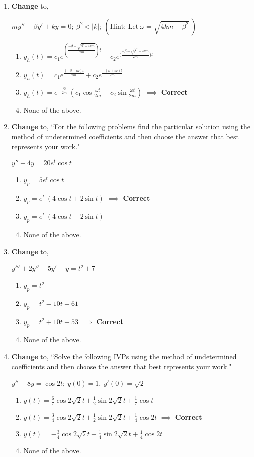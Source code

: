 \documentclass[fleqn]{article}[11pt]
\begin{document}
\begin{enumerate}
	\item \textbf{Change} to,
	
		\(my''+\beta y'+ky=0;\ \beta^{2} < |k|;\ (\text{Hint: Let}\ \omega=\sqrt{4km-\beta^{2}}\ )\)
			\begin{enumerate}
				\item $y_{h}(t)=c_{1}e^{(\frac{-\beta+\sqrt{\beta^{2}-4km}}{2m})t}+c_{2}e^{{(\frac{-\beta-\sqrt{\beta^{2}-4km}}{2m}})t}$
				\item $y_{h}(t)=c_{1}e^{\frac{(-\beta+i\omega)t}{2m}}+c_{2}e^{\frac{-(\beta+i\omega)t}{2m}}$
				\item $y_{h}(t)=e^{-\frac{\beta t}{2m}}\ (c_{1}\cos{\frac{\omega t}{2m}}+c_{2}\sin{\frac{\omega t}{2m}})$ $\implies$ \textbf{Correct}
				\item None of the above.
			\end{enumerate}
		
	\item \textbf{Change} to, ``For the following problems find the particular solution using the method of undetermined coefficients and then choose the answer that best represents your work."
	
		\(y''+4y=20e^{t}\cos{t}\)
			\begin{enumerate}
				\item $y_{p}=5e^{t}\cos{t}$
				\item $y_{p}=e^{t}\ (4\cos{t}+2\sin{t})$ $\implies$ \textbf{Correct}
				\item $y_{p}=e^{t}\ (4\cos{t}-2\sin{t})$
				\item None of the above.
			\end{enumerate}
	
	\item \textbf{Change} to,
	
		\(y'''+2y''-5y'+y=t^{2}+7\)
			\begin{enumerate}
				\item $y_{p}=t^{2}$
				\item $y_{p}=t^{2}-10t+61$
				\item $y_{p}=t^{2}+10t+53$ $\implies$ \textbf{Correct} 
				\item None of the above.
			\end{enumerate}

	
	\item \textbf{Change} to, ``Solve the following IVPs using the method of undetermined coefficients and then choose the answer that best represents your work."
	
		\(y''+8y=\cos{2t};\ y(0)=1,\ y'(0)= \sqrt{2}\)
			\begin{enumerate}
				\item $y(t)=\frac{6}{7}\cos{2\sqrt{2}t}+\frac{1}{2}\sin{2\sqrt{2}t}+\frac{1}{7}\cos{t}$
				\item $y(t)=\frac{3}{4}\cos{2\sqrt{2}t}+\frac{1}{2}\sin{2\sqrt{2}t}+\frac{1}{4}\cos{2t}$ $\implies$ \textbf{Correct}
				\item $y(t)=-\frac{3}{4}\cos{2\sqrt{2}t}-\frac{1}{4}\sin{2\sqrt{2}t}+\frac{1}{4}\cos{2t}$
				\item None of the above.
			\end{enumerate}
	

\end{enumerate}
\end{document}
